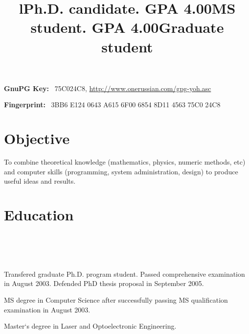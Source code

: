 \documentclass[10pt,overlapped,line]{res}
\begin{document}
\begin{resume}
 \vspace{-1.15em}
 \small{
 \hspace{7.48em}\textbf{GnuPG Key:}
 \ 75C024C8, \url{http://www.onerussian.com/gpg-yoh.asc}

 \vspace{-1.3em}
 \hspace{7.7em}\textbf{Fingerprint:}
 \ 3BB6 E124 0643 A615 6F00 6854 8D11 4563 75C0 24C8
}

\section{Objective}



To combine theoretical knowledge (mathematics, physics, numeric
methods, etc) and computer skills (programming, system administration,
design) to produce useful ideas and results.

\section{Education}
\begin{format}
  \title{l}\\
  \\
  \body\\
\end{format}

\title{Ph.D. candidate. GPA 4.00}
\begin{position}
  Transfered graduate Ph.D. program student. Passed comprehensive
  examination in August 2003. Defended PhD thesis proposal in
  September 2005.
\end{position}

 \title{MS student. GPA 4.00}
 \begin{position}
  MS degree in Computer Science after successfully passing MS
 qualification examination in August 2003.
 \end{position}

 \title{Graduate student}
 \begin{position}
  Master`s degree in Laser and Optoelectronic Engineering.
 \end{position}


\end{resume}
\end{document}
